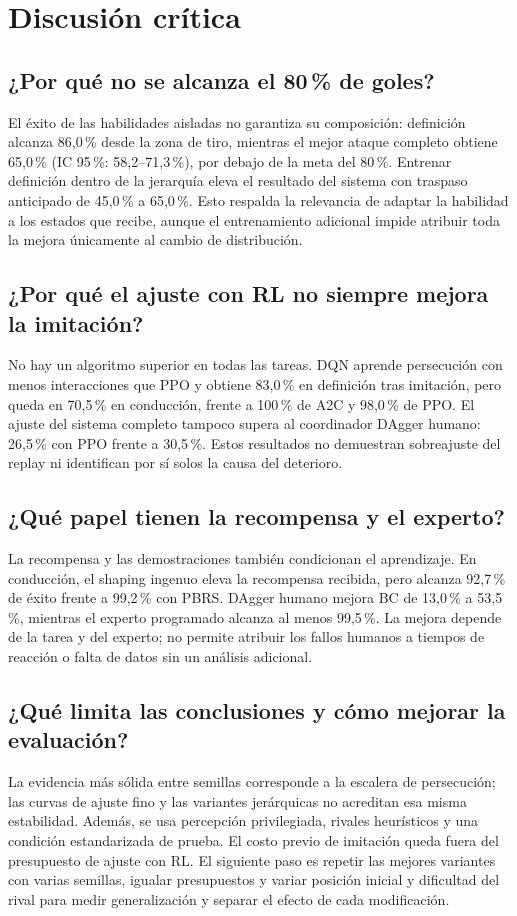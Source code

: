 \section{Discusión crítica}
\subsection{¿Por qué no se alcanza el 80\,\% de goles?}
El éxito de las habilidades aisladas no garantiza su composición: definición
alcanza 86,0\,\% desde la zona de tiro, mientras el mejor ataque completo obtiene
65,0\,\% (IC 95\,\%: 58,2--71,3\,\%), por debajo de la meta del 80\,\%.
Entrenar definición dentro de la jerarquía eleva el resultado del sistema con
traspaso anticipado de 45,0\,\% a 65,0\,\%. Esto respalda la relevancia de adaptar
la habilidad a los estados que recibe, aunque el entrenamiento adicional impide
atribuir toda la mejora únicamente al cambio de distribución.

\subsection{¿Por qué el ajuste con RL no siempre mejora la imitación?}
No hay un algoritmo superior en todas las tareas. DQN aprende persecución con
menos interacciones que PPO y obtiene 83,0\,\% en definición tras imitación,
pero queda en 70,5\,\% en conducción, frente a 100\,\% de A2C y 98,0\,\% de PPO.
El ajuste del sistema completo tampoco supera al coordinador DAgger humano:
26,5\,\% con PPO frente a 30,5\,\%. Estos resultados no demuestran sobreajuste
del replay ni identifican por sí solos la causa del deterioro.

\subsection{¿Qué papel tienen la recompensa y el experto?}
La recompensa y las demostraciones también condicionan el aprendizaje.
En conducción, el shaping ingenuo eleva la recompensa recibida, pero alcanza
92,7\,\% de éxito frente a 99,2\,\% con PBRS. DAgger humano mejora BC de
13,0\,\% a 53,5\,\%, mientras el experto programado alcanza al menos 99,5\,\%.
La mejora depende de la tarea y del experto; no permite atribuir los fallos
humanos a tiempos de reacción o falta de datos sin un análisis adicional.

\subsection{¿Qué limita las conclusiones y cómo mejorar la evaluación?}
La evidencia más sólida entre semillas corresponde a la escalera de persecución;
las curvas de ajuste fino y las variantes jerárquicas no acreditan esa misma
estabilidad. Además, se usa percepción privilegiada, rivales heurísticos y una
condición estandarizada de prueba. El costo previo de imitación queda fuera del
presupuesto de ajuste con RL. El siguiente paso es repetir las mejores variantes
con varias semillas, igualar presupuestos y variar posición inicial y dificultad
del rival para medir generalización y separar el efecto de cada modificación.
